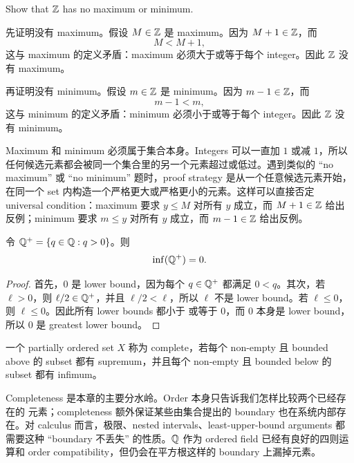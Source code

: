 \begin{exerciseblock}
Show that \(\mathbb{Z}\) has no maximum or minimum.
\end{exerciseblock}

\begin{solution}
先证明没有 maximum。假设 \(M\in\mathbb{Z}\) 是 maximum。因为 \(M+1\in\mathbb{Z}\)，而
\[
  M<M+1,
\]
这与 maximum 的定义矛盾：maximum 必须大于或等于每个 integer。因此 \(\mathbb{Z}\) 没有
maximum。

再证明没有 minimum。假设 \(m\in\mathbb{Z}\) 是 minimum。因为 \(m-1\in\mathbb{Z}\)，而
\[
  m-1<m,
\]
这与 minimum 的定义矛盾：minimum 必须小于或等于每个 integer。因此 \(\mathbb{Z}\) 没有
minimum。
\end{solution}

\begin{explanation}
Maximum 和 minimum 必须属于集合本身。Integers 可以一直加 \(1\) 或减 \(1\)，所以
任何候选元素都会被同一个集合里的另一个元素超过或低过。遇到类似的
``no maximum'' 或 ``no minimum'' 题时，proof strategy 是从一个任意候选元素开始，
在同一个 set 内构造一个严格更大或严格更小的元素。这样可以直接否定 universal
condition：maximum 要求 \(y\leq M\) 对所有 \(y\) 成立，而 \(M+1\in\mathbb{Z}\) 给出
反例；minimum 要求 \(m\leq y\) 对所有 \(y\) 成立，而 \(m-1\in\mathbb{Z}\) 给出反例。
\end{explanation}

\begin{proposition}
令 \(\mathbb{Q}^+=\{q\in\mathbb{Q}:q>0\}\)。则
\[
  \inf(\mathbb{Q}^+)=0.
\]
\end{proposition}

\begin{proof}
首先，\(0\) 是 lower bound，因为每个 \(q\in\mathbb{Q}^+\) 都满足 \(0<q\)。其次，若
\(\ell>0\)，则 \(\ell/2\in\mathbb{Q}^+\)，并且 \(\ell/2<\ell\)，所以 \(\ell\) 不是
lower bound。若 \(\ell\leq0\)，则 \(\ell\leq0\)。因此所有 lower bounds 都小于
或等于 \(0\)，而 \(0\) 本身是 lower bound，所以 \(0\) 是 greatest lower bound。
\end{proof}

\begin{definition}[Completeness]
一个 partially ordered set \(X\) 称为 complete，若每个 non-empty 且 bounded
above 的 subset 都有 supremum，并且每个 non-empty 且 bounded below 的 subset
都有 infimum。
\end{definition}

Completeness 是本章的主要分水岭。Order 本身只告诉我们怎样比较两个已经存在的
元素；completeness 额外保证某些由集合提出的 boundary 也在系统内部存在。对
calculus 而言，极限、nested intervals、least-upper-bound arguments 都需要这种
``boundary 不丢失'' 的性质。\(\mathbb{Q}\) 作为 ordered field 已经有良好的四则运算和
order compatibility，但仍会在平方根这样的 boundary 上漏掉元素。

